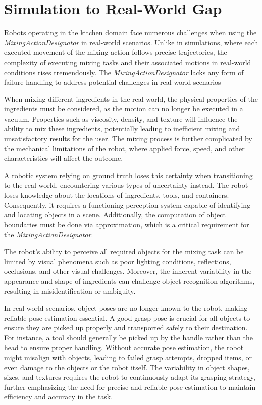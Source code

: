 \section{Simulation to Real-World Gap}
\label{sec: simulation to real world gap}
Robots operating in the kitchen domain face numerous challenges when using the \textit{MixingActionDesignator} in real-world scenarios. 
Unlike in simulations, where each executed movement of the mixing action follows precise trajectories, 
the complexity of executing mixing tasks and their associated motions in real-world conditions rises tremendously. 
The \textit{MixingActionDesignator} lacks any form of failure handling to address potential challenges in real-world scenarios

When mixing different ingredients in the real world, the physical properties of the ingredients must be considered, 
as the motion can no longer be executed in a vacuum. Properties such as viscosity, density, 
and texture will influence the ability to mix these ingredients, potentially leading to inefficient mixing and 
unsatisfactory results for the user. 
The mixing process is further complicated by the mechanical limitations of the robot, 
where applied force, speed, and other characteristics will affect the outcome.

A robotic system relying on ground truth loses this certainty when transitioning to the real world, 
encountering various types of uncertainty instead. 
The robot loses knowledge about the locations of ingredients, tools, and containers. 
Consequently, it requires a functioning perception system capable of identifying and locating objects in a scene. 
Additionally, the computation of object boundaries must be done via approximation, which is a critical requirement for the \textit{MixingActionDesignator}.

The robot's ability to perceive all required objects for the mixing task can be limited by 
visual phenomena such as poor lighting conditions, reflections, occlusions, and other visual challenges. 
Moreover, the inherent variability in the appearance and shape of ingredients can challenge object recognition algorithms, resulting in misidentification or ambiguity.

In real world scenarios, object poses are no longer known to the robot, 
making reliable pose estimation essential. 
A good grasp pose is crucial for all objects to ensure they are picked up properly and transported safely to their destination. 
For instance, a tool should generally be picked up by the handle rather than the head to ensure proper handling. 
Without accurate pose estimation, the robot might misalign with objects, leading to failed grasp attempts, dropped items,
or even damage to the objects or the robot itself. The variability in object shapes, sizes, 
and textures requires the robot to continuously adapt its grasping strategy, further emphasizing the need for precise and reliable pose estimation 
to maintain efficiency and accuracy in the task.

